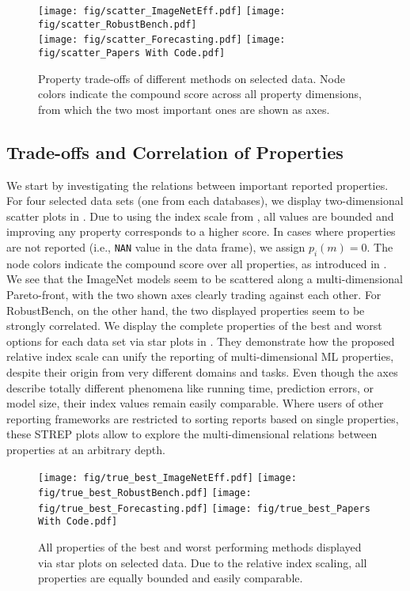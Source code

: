 \documentclass[sn-mathphys,Numbered]{sn-jnl}%
\theoremstyle{thmstylethree}%
\begin{document}
\begin{figure*}
    \centering
    \texttt{[image: fig/scatter\_ImageNetEff.pdf]}
    \texttt{[image: fig/scatter\_RobustBench.pdf]}
    \\
    \vspace{1em}
    \texttt{[image: fig/scatter\_Forecasting.pdf]}
    \texttt{[image: fig/scatter\_Papers With Code.pdf]}
    \caption{Property trade-offs of different methods on selected data. Node colors indicate the compound score across all property dimensions, from which the two most important ones are shown as axes.}
    \label{fig:prop_spaces}
\end{figure*}    

\subsection{Trade-offs and Correlation of Properties}

We start by investigating the relations between important reported properties.
For four selected data sets (one from each databases), we display two-dimensional scatter plots in .
Due to using the index scale from , all values are bounded and improving any property corresponds to a higher score.
In cases where properties are not reported (i.e., \texttt{NAN} value in the data frame), we assign $p_i(m) = 0$.
The node colors indicate the compound score over all properties, as introduced in .
We see that the ImageNet models seem to be scattered along a multi-dimensional Pareto-front, with the two shown axes clearly trading against each other.
For RobustBench, on the other hand, the two displayed properties seem to be strongly correlated.
We display the complete properties of the best and worst options for each data set via star plots in .
They demonstrate how the proposed relative index scale can unify the reporting of multi-dimensional ML properties, despite their origin from very different domains and tasks.
Even though the axes describe totally different phenomena like running time, prediction errors, or model size, their index values remain easily comparable.
Where users of other reporting frameworks are restricted to sorting reports based on single properties, these STREP plots allow to explore the multi-dimensional relations between properties at an arbitrary depth.


\begin{figure*}
    \centering
    \texttt{[image: fig/true\_best\_ImageNetEff.pdf]}
    \hfill
    \texttt{[image: fig/true\_best\_RobustBench.pdf]}
    \hfill
    \texttt{[image: fig/true\_best\_Forecasting.pdf]}
    \hfill
    \texttt{[image: fig/true\_best\_Papers With Code.pdf]}
    \caption{All properties of the best and worst performing methods displayed via star plots on selected data. Due to the relative index scaling, all properties are equally bounded and easily comparable.}
    \label{fig:prop_stars}
\end{figure*}
\end{document}
